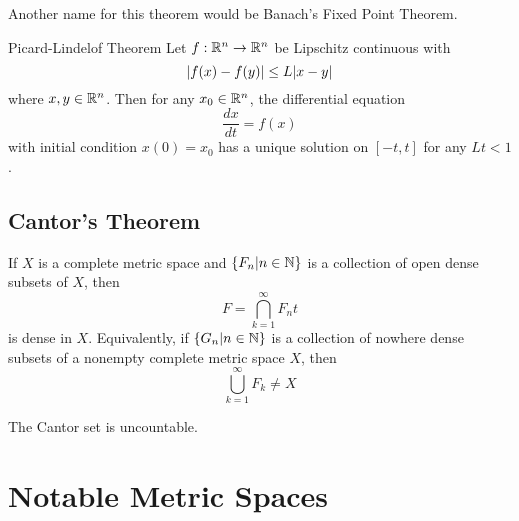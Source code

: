 \documentclass[a4paper]{article}
\begin{document}
Another name for this theorem would be Banach's Fixed Point Theorem. 

\begin{thm}{Picard-Lindelof Theorem}{} Let $f:\mathbb{R}^n\to\mathbb{R}^n$ be Lipschitz continuous with $$\abs{f(x)-f(y)}\leq L\abs{x-y}$$ where $x,y\in\mathbb{R}^n$. Then for any $x_0\in\mathbb{R}^n$, the differential equation $$\frac{dx}{dt}=f(x)$$ with initial condition $x(0)=x_0$ has a unique solution on $[-t,t]$ for any $Lt<1$. 
\end{thm}

\subsection{Cantor's Theorem}
\begin{thm}{}{} If $X$ is a complete metric space and $\{F_n|n\in\mathbb{N}\}$ is a collection of open dense subsets of $X$, then $$F=\bigcap_{k=1}^\infty F_nt$$ is dense in $X$. Equivalently, if $\{G_n|n\in\mathbb{N}\}$ is a collection of nowhere dense subsets of a nonempty complete metric space $X$, then $$\bigcup_{k=1}^\infty F_k\neq X$$
\end{thm}

\begin{lmm}{}{} The Cantor set is uncountable. 
\end{lmm}







\pagebreak
\section{Notable Metric Spaces}
\end{document}
